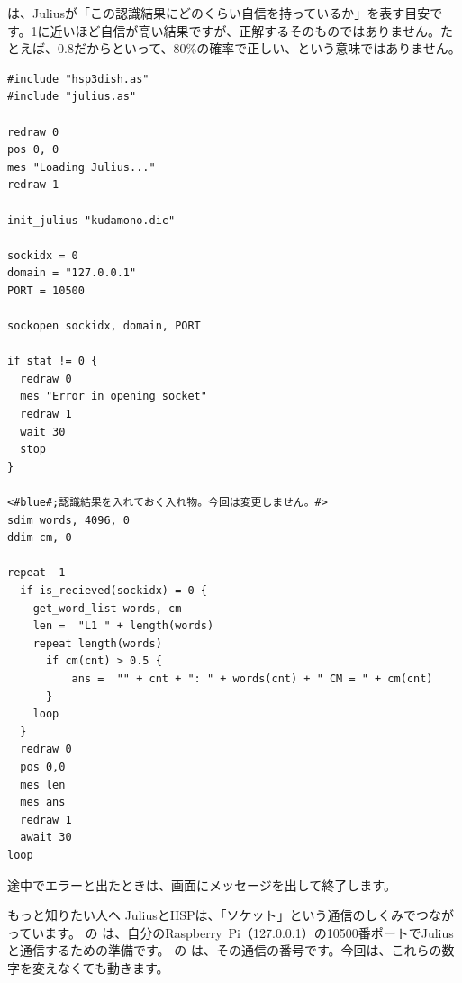 \documentclass[text06.tex]{subfiles}
\begin{document}
 は、Juliusが「この認識結果にどのくらい自信を持っているか」を表す目安です。1に近いほど自信が高い結果ですが、正解するそのものではありません。たとえば、0.8だからといって、80\%の確率で正しい、という意味ではありません。

\begin{lstlisting}[caption=julius.hsp,label=julius.hsp]
#include "hsp3dish.as"
#include "julius.as"

redraw 0
pos 0, 0
mes "Loading Julius..."
redraw 1

init_julius "kudamono.dic"

sockidx = 0
domain = "127.0.0.1"
PORT = 10500

sockopen sockidx, domain, PORT

if stat != 0 {
  redraw 0
  mes "Error in opening socket"
  redraw 1
  wait 30
  stop
}

<#blue#;認識結果を入れておく入れ物。今回は変更しません。#>
sdim words, 4096, 0
ddim cm, 0

repeat -1
  if is_recieved(sockidx) = 0 {
    get_word_list words, cm
    len =  "L1 " + length(words)
    repeat length(words)
      if cm(cnt) > 0.5 {
          ans =  "" + cnt + ": " + words(cnt) + " CM = " + cm(cnt)
      }
    loop
  }
  redraw 0
  pos 0,0
  mes len
  mes ans
  redraw 1
  await 30
loop
\end{lstlisting}

途中でエラーと出たときは、画面にメッセージを出して終了します。

\begin{itembox}[c]{もっと知りたい人へ}
JuliusとHSPは、「ソケット」という通信のしくみでつながっています。\mbox{} の  は、自分の\mbox{Raspberry Pi}（127.0.0.1）の10500番ポートでJuliusと通信するための準備です。 の  は、その通信の番号です。今回は、これらの数字を変えなくても動きます。
\end{itembox}

\begin{tcolorbox}[title=\useOmetoi]
\begin{enumerate}
\end{enumerate}
\end{tcolorbox}
\end{document}
